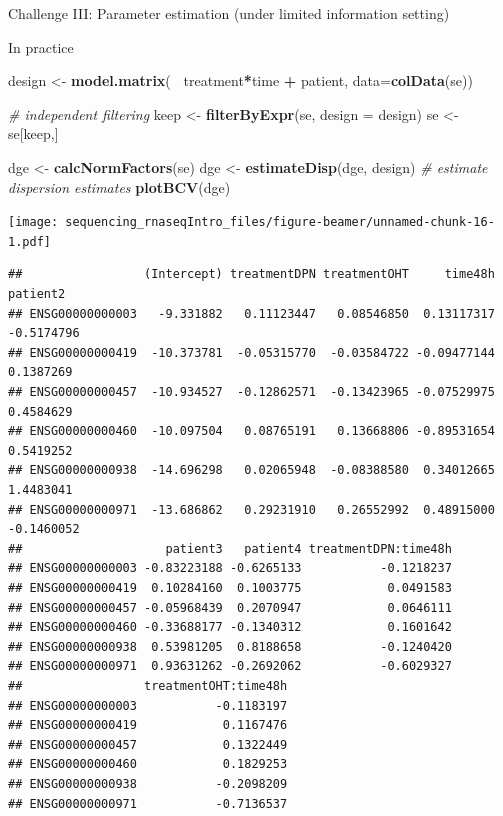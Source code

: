 \documentclass[ignorenonframetext,]{beamer}
\newenvironment{Shaded}{\begin{snugshade}}{\end{snugshade}}
\newcommand{\CommentTok}[1]{\textcolor[rgb]{0.56,0.35,0.01}{\textit{#1}}}
\newcommand{\DataTypeTok}[1]{\textcolor[rgb]{0.13,0.29,0.53}{#1}}
\newcommand{\KeywordTok}[1]{\textcolor[rgb]{0.13,0.29,0.53}{\textbf{#1}}}
\newcommand{\NormalTok}[1]{#1}
\newcommand{\OperatorTok}[1]{\textcolor[rgb]{0.81,0.36,0.00}{\textbf{#1}}}
\newcommand{\StringTok}[1]{\textcolor[rgb]{0.31,0.60,0.02}{#1}}
\begin{document}
\begin{frame}[fragile]{Challenge III: Parameter estimation (under
limited information setting)}
\begin{block}{In practice}
\begin{Shaded}
\begin{Highlighting}[]
\NormalTok{design <-}\StringTok{ }\KeywordTok{model.matrix}\NormalTok{(}\OperatorTok{~}\StringTok{ }\NormalTok{treatment}\OperatorTok{*}\NormalTok{time }\OperatorTok{+}\StringTok{ }\NormalTok{patient, }\DataTypeTok{data=}\KeywordTok{colData}\NormalTok{(se))}

\CommentTok{# independent filtering}
\NormalTok{keep <-}\StringTok{ }\KeywordTok{filterByExpr}\NormalTok{(se, }\DataTypeTok{design =}\NormalTok{ design)}
\NormalTok{se <-}\StringTok{ }\NormalTok{se[keep,]}

\NormalTok{dge <-}\StringTok{ }\KeywordTok{calcNormFactors}\NormalTok{(se)}
\NormalTok{dge <-}\StringTok{ }\KeywordTok{estimateDisp}\NormalTok{(dge, design) }\CommentTok{# estimate dispersion estimates}
\KeywordTok{plotBCV}\NormalTok{(dge)}
\end{Highlighting}
\end{Shaded}

\texttt{[image: sequencing\_rnaseqIntro\_files/figure-beamer/unnamed-chunk-16-1.pdf]}

\begin{Shaded}
\end{Shaded}

\begin{verbatim}
##                 (Intercept) treatmentDPN treatmentOHT     time48h   patient2
## ENSG00000000003   -9.331882   0.11123447   0.08546850  0.13117317 -0.5174796
## ENSG00000000419  -10.373781  -0.05315770  -0.03584722 -0.09477144  0.1387269
## ENSG00000000457  -10.934527  -0.12862571  -0.13423965 -0.07529975  0.4584629
## ENSG00000000460  -10.097504   0.08765191   0.13668806 -0.89531654  0.5419252
## ENSG00000000938  -14.696298   0.02065948  -0.08388580  0.34012665  1.4483041
## ENSG00000000971  -13.686862   0.29231910   0.26552992  0.48915000 -0.1460052
##                    patient3   patient4 treatmentDPN:time48h
## ENSG00000000003 -0.83223188 -0.6265133           -0.1218237
## ENSG00000000419  0.10284160  0.1003775            0.0491583
## ENSG00000000457 -0.05968439  0.2070947            0.0646111
## ENSG00000000460 -0.33688177 -0.1340312            0.1601642
## ENSG00000000938  0.53981205  0.8188658           -0.1240420
## ENSG00000000971  0.93631262 -0.2692062           -0.6029327
##                 treatmentOHT:time48h
## ENSG00000000003           -0.1183197
## ENSG00000000419            0.1167476
## ENSG00000000457            0.1322449
## ENSG00000000460            0.1829253
## ENSG00000000938           -0.2098209
## ENSG00000000971           -0.7136537
\end{verbatim}

\end{block}

\end{frame}
\end{document}
